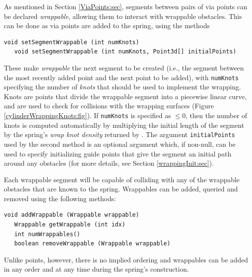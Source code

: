 As mentioned in Section \ref{ViaPoints:sec}, segments between pairs of
via points can be declared {\it wrappable}, allowing them to interact
with wrappable obstacles. This can be done as via points are added
to the spring, using the methods
%
\begin{lstlisting}[]
   void setSegmentWrappable (int numKnots)
   void setSegmentWrappable (int numKnots, Point3d[] initialPoints)
\end{lstlisting}
%
These make {\it wrappable} the next segment to be created (i.e., the segment
between the most recently added point and the next point to be added), with
{\tt numKnots} specifying the number of {\it knots} that should be used to
implement the wrapping. Knots are points that divide the wrappable segment into
a piecewise linear curve, and are used to check for collisions with the
wrapping surfaces (Figure \ref{cylinderWrappingKnots:fig}).  If {\tt numKnots}
is specified as $\le 0$, then the number of knots is computed automatically by
multiplying the initial length of the segment by the spring's {\it wrap knot
density} returned by .
The argument {\tt initialPoints} used by the second method is an optional
argument which, if non-null, can be used to specify initializing guide points
that give the segment an initial path around any obstacles (for more
details, see Section \ref{wrappingInit:sec}).

Each wrappable segment will be capable of colliding with any of the
wrappable obstacles that are known to the spring.  Wrappables can be
added, queried and removed using the following methods:
%
\begin{lstlisting}[]
   void addWrappable (Wrappable wrappable)
   Wrappable getWrappable (int idx)
   int numWrappables()
   boolean removeWrappable (Wrappable wrappable)
\end{lstlisting}
%
Unlike points, however, there is no implied ordering and wrappables
can be added in any order and at any time during the spring's
construction.

